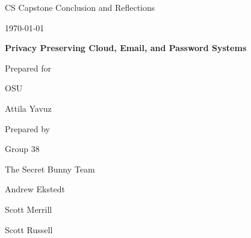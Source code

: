 \def \CapstoneTeamName{		The Secret Bunny Team}
\def \CapstoneTeamNumber{		38}
\def \GroupMemberOne{			Andrew Ekstedt}
\def \GroupMemberTwo{			Scott Merrill}
\def \GroupMemberThree{			Scott Russell}
\def \CapstoneProjectName{		Privacy Preserving Cloud, Email, and Password Systems}
\def \CapstoneSponsorCompany{	OSU}
\def \CapstoneSponsorPerson{		Attila Yavuz}

\def \DocType{	%
                Conclusion and Reflections
				}
\renewcommand{\NameSigPair}[1]{#1}


\begin{titlepage}
    \begin{singlespace}
        \hfill 
        \par\vspace{.2in}
        \centering
        \scshape{
            \huge CS Capstone \DocType \par
            {\large\today}\par
            \vspace{.5in}
            \textbf{\Huge\CapstoneProjectName}\par
            \vfill
            {\large Prepared for}\par
            \Huge \CapstoneSponsorCompany\par
            \vspace{5pt}
            {\Large\NameSigPair{\CapstoneSponsorPerson}\par}
            {\large Prepared by }\par
            Group\CapstoneTeamNumber\par
            \CapstoneTeamName\par 
            \vspace{5pt}
            {\Large
                \NameSigPair{\GroupMemberOne}\par
                \NameSigPair{\GroupMemberTwo}\par
                \NameSigPair{\GroupMemberThree}\par           
            }
            \vspace{20pt}
        }
        \begin{abstract}
        \end{abstract}     
    \end{singlespace}
\end{titlepage}

